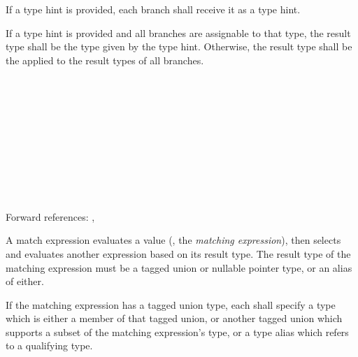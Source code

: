\specsubsubitem
If a type hint is provided, each branch shall receive it as a type hint.

\specsubsubitem
If a type hint is provided and all branches are assignable to that type, the
result type shall be the type given by the type hint. Otherwise, the result type
shall be the  applied to the result
types of all branches.


\begin{grammar}
 \\
	  \terminal{(}  \terminal{)} \terminal{\{}  \terminal{\}} \\

 \\
	  \\

 \\
	   \terminal{:}  \terminal{=>}  \\
	  \terminal{(}  \terminal{)} \terminal{:}  \terminal{=>}  \\
	  \terminal{=>}  \\
	 \terminal{=>}  \\
\end{grammar}

Forward references: , 

\specsubsubitem
A match expression evaluates a value (, the
\textit{matching expression}), then selects and evaluates another expression
based on its result type. The result type of the matching expression must be a
tagged union or nullable pointer type, or an alias of either.

\specsubsubitem
If the matching expression has a tagged union type, each
 shall specify a type which is either a member of that
tagged union, or another tagged union which supports a subset of the matching
expression's type, or a type alias which refers to a qualifying type.

